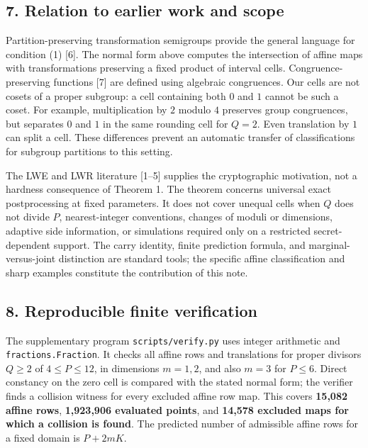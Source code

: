 \documentclass[
]{article}
\begin{document}
\subsection{7. Relation to earlier work and
scope}\label{relation-to-earlier-work-and-scope}

Partition-preserving transformation semigroups provide the general
language for condition (1) {[}6{]}. The normal form above computes the
intersection of affine maps with transformations preserving a fixed
product of interval cells. Congruence-preserving functions {[}7{]} are
defined using algebraic congruences. Our cells are not cosets of a
proper subgroup: a cell containing both \(0\) and \(1\) cannot be such a
coset. For example, multiplication by \(2\) modulo \(4\) preserves group
congruences, but separates \(0\) and \(1\) in the same rounding cell for
\(Q=2\). Even translation by \(1\) can split a cell. These differences
prevent an automatic transfer of classifications for subgroup partitions
to this setting.

The LWE and LWR literature {[}1--5{]} supplies the cryptographic
motivation, not a hardness consequence of Theorem 1. The theorem
concerns universal exact postprocessing at fixed parameters. It does not
cover unequal cells when \(Q\) does not divide \(P\), nearest-integer
conventions, changes of moduli or dimensions, adaptive side information,
or simulations required only on a restricted secret-dependent support.
The carry identity, finite prediction formula, and marginal-versus-joint
distinction are standard tools; the specific affine classification and
sharp examples constitute the contribution of this note.

\subsection{8. Reproducible finite
verification}\label{reproducible-finite-verification}

The supplementary program \texttt{scripts/verify.py} uses integer
arithmetic and \texttt{fractions.Fraction}. It checks all affine rows
and translations for proper divisors \(Q\ge2\) of \(4\le P\le12\), in
dimensions \(m=1,2\), and also \(m=3\) for \(P\le6\). Direct constancy
on the zero cell is compared with the stated normal form; the verifier
finds a collision witness for every excluded affine row map. This covers
\textbf{15,082 affine rows}, \textbf{1,923,906 evaluated points}, and
\textbf{14,578 excluded maps for which a collision is found}. The
predicted number of admissible affine rows for a fixed domain is
\(P+2mK\).
\end{document}
